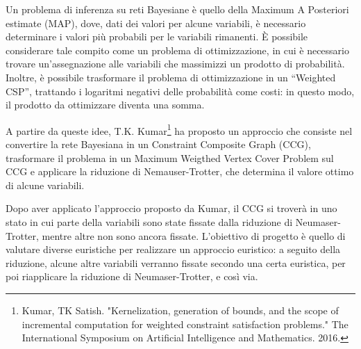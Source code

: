 Un problema di inferenza su reti Bayesiane è quello della Maximum A Posteriori estimate (MAP), dove, dati dei valori per alcune variabili, è necessario determinare i valori più probabili per le variabili rimanenti. È possibile considerare tale compito come un problema di ottimizzazione, in cui è necessario trovare un'assegnazione alle variabili che massimizzi un prodotto di probabilità. Inoltre, è possibile trasformare il problema di ottimizzazione in un ``Weighted CSP'', trattando i logaritmi negativi delle probabilità come costi: in questo modo, il prodotto da ottimizzare diventa una somma.

A partire da queste idee, T.K. Kumar\footnote{Kumar, TK Satish. "Kernelization, generation of bounds, and the scope of incremental computation for weighted constraint satisfaction problems." The International Symposium on Artificial Intelligence and Mathematics. 2016.} ha proposto un approccio che consiste nel convertire la rete Bayesiana in un Constraint Composite Graph (CCG), trasformare il problema in un Maximum Weigthed Vertex Cover Problem sul CCG e applicare la riduzione di Nemauser-Trotter, che determina il valore ottimo di alcune variabili.

Dopo aver applicato l'approccio proposto da Kumar, il CCG si troverà in uno stato in cui parte della variabili sono state fissate dalla riduzione di Neumaser-Trotter, mentre altre non sono ancora fissate. L'obiettivo di progetto è quello di valutare diverse euristiche per realizzare un approccio euristico: a seguito della riduzione, alcune altre variabili verranno fissate secondo una certa euristica, per poi riapplicare la riduzione di Neumaser-Trotter, e così via. 